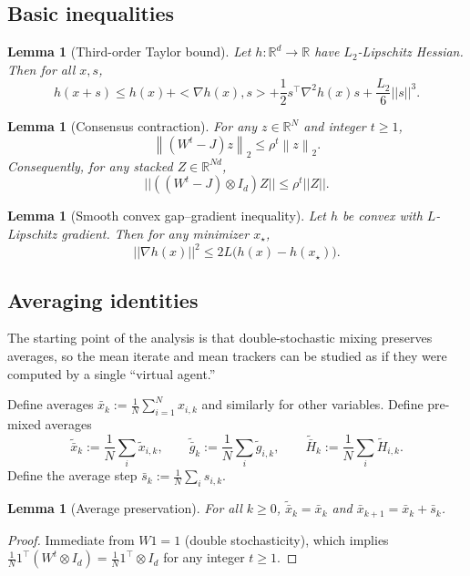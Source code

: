\documentclass[11pt,a4paper]{article}
\def\one{1}%
\def\J{J}%
\def\norm#1{||#1||}%
\def\ip#1#2{<#1,#2>}%
\newtheorem{lemma}[theorem]{Lemma}
\newcommand{\R}{\mathbb{R}}
\newcommand{\one}{\mathbf{1}}
\newcommand{\ip}[2]{\left\langle #1,#2\right\rangle}
\newcommand{\norm}[1]{\left\|#1\right\|}
\newcommand{\normtwo}[1]{\left\|#1\right\|_2}
\newcommand{\J}{\left(\frac{1}{N}\one\one^\top\right)}
\begin{document}
\subsection{Basic inequalities}\label{ssec:basic}
\begin{lemma}[Third-order Taylor bound]\label{lem:taylor3}
Let $h:\R^d\to\R$ have $L_2$-Lipschitz Hessian. Then for all $x,s$,
\[
h(x+s)\le h(x)+\ip{\nabla h(x)}{s}+\frac12 s^\top\nabla^2 h(x)s+\frac{L_2}{6}\norm{s}^3.
\]
\end{lemma}

\begin{lemma}[Consensus contraction]\label{lem:consensus}
For any $z\in\R^N$ and integer $t\ge 1$,
\[
\normtwo{(W^t-\J)z}\le \rho^t\normtwo{z}.
\]
Consequently, for any stacked $Z\in\R^{Nd}$,
\[
\norm{((W^t-\J)\otimes I_d)Z}\le \rho^t\norm{Z}.
\]
\end{lemma}

\begin{lemma}[Smooth convex gap--gradient inequality]\label{lem:gap-grad}
Let $h$ be convex with $L$-Lipschitz gradient. Then for any minimizer $x_\star$,
\[
\norm{\nabla h(x)}^2\le 2L\big(h(x)-h(x_\star)\big).
\]
\end{lemma}

\subsection{Averaging identities}\label{ssec:avg}
The starting point of the analysis is that double-stochastic mixing
preserves averages, so the mean iterate and mean trackers can be
studied as if they were computed by a single ``virtual agent.''

Define averages $\bar x_k:=\frac1N\sum_{i=1}^N x_{i,k}$ and similarly for other variables.
Define pre-mixed averages
\[
\tilde{\bar x}_k:=\frac1N\sum_i \tilde x_{i,k},\qquad
\tilde{\bar g}_k:=\frac1N\sum_i \tilde g_{i,k},\qquad
\tilde{\bar H}_k:=\frac1N\sum_i \tilde H_{i,k}.
\]
Define the average step $\bar s_k:=\frac1N\sum_i s_{i,k}$.

\begin{lemma}[Average preservation]\label{lem:avg-pres}
For all $k\ge0$, $\tilde{\bar x}_k=\bar x_k$ and $\bar x_{k+1}=\bar x_k+\bar s_k$.
\end{lemma}
\begin{proof}
Immediate from $W\one=\one$ (double stochasticity),
which implies $\frac1N\one^\top(W^t\otimes I_d)=\frac1N\one^\top\otimes I_d$
for any integer $t\ge 1$.
\end{proof}
\end{document}
